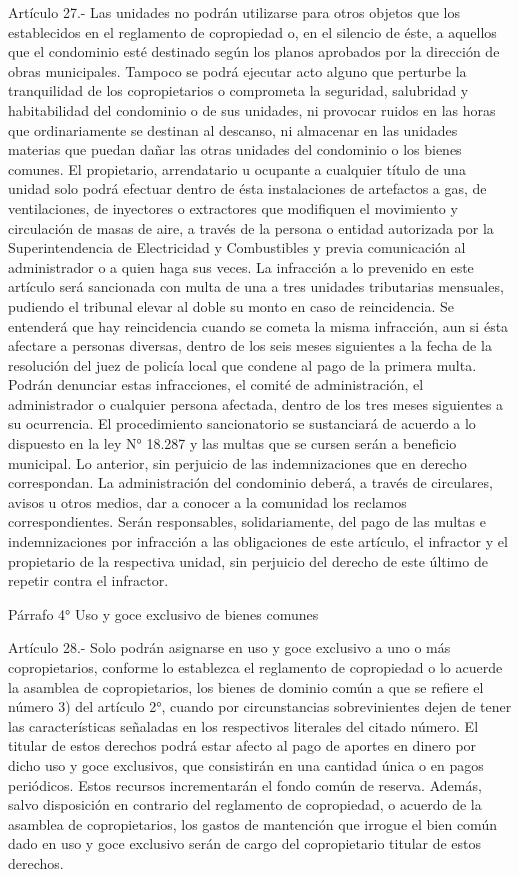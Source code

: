      
    Artículo 27.- Las unidades no podrán utilizarse para otros objetos que los establecidos en el reglamento de copropiedad o, en el silencio de éste, a aquellos que el condominio esté destinado según los planos aprobados por la dirección de obras municipales. Tampoco se podrá ejecutar acto alguno que perturbe la tranquilidad de los copropietarios o comprometa la seguridad, salubridad y habitabilidad del condominio o de sus unidades, ni provocar ruidos en las horas que ordinariamente se destinan al descanso, ni almacenar en las unidades materias que puedan dañar las otras unidades del condominio o los bienes comunes.
    El propietario, arrendatario u ocupante a cualquier título de una unidad solo podrá efectuar dentro de ésta instalaciones de artefactos a gas, de ventilaciones, de inyectores o extractores que modifiquen el movimiento y circulación de masas de aire, a través de la persona o entidad autorizada por la Superintendencia de Electricidad y Combustibles y previa comunicación al administrador o a quien haga sus veces.
    La infracción a lo prevenido en este artículo será sancionada con multa de una a tres unidades tributarias mensuales, pudiendo el tribunal elevar al doble su monto en caso de reincidencia. Se entenderá que hay reincidencia cuando se cometa la misma infracción, aun si ésta afectare a personas diversas, dentro de los seis meses siguientes a la fecha de la resolución del juez de policía local que condene al pago de la primera multa. Podrán denunciar estas infracciones, el comité de administración, el administrador o cualquier persona afectada, dentro de los tres meses siguientes a su ocurrencia. El procedimiento sancionatorio se sustanciará de acuerdo a lo dispuesto en la ley N° 18.287 y las multas que se cursen serán a beneficio municipal. Lo anterior, sin perjuicio de las indemnizaciones que en derecho correspondan.
    La administración del condominio deberá, a través de circulares, avisos u otros medios, dar a conocer a la comunidad los reclamos correspondientes.
    Serán responsables, solidariamente, del pago de las multas e indemnizaciones por infracción a las obligaciones de este artículo, el infractor y el propietario de la respectiva unidad, sin perjuicio del derecho de este último de repetir contra el infractor.
   
    Párrafo 4°
    Uso y goce exclusivo de bienes comunes

     
    Artículo 28.- Solo podrán asignarse en uso y goce exclusivo a uno o más copropietarios, conforme lo establezca el reglamento de copropiedad o lo acuerde la asamblea de copropietarios, los bienes de dominio común a que se refiere el número 3) del artículo 2°, cuando por circunstancias sobrevinientes dejen de tener las características señaladas en los respectivos literales del citado número. El titular de estos derechos podrá estar afecto al pago de aportes en dinero por dicho uso y goce exclusivos, que consistirán en una cantidad única o en pagos periódicos. Estos recursos incrementarán el fondo común de reserva. Además, salvo disposición en contrario del reglamento de copropiedad, o acuerdo de la asamblea de copropietarios, los gastos de mantención que irrogue el bien común dado en uso y goce exclusivo serán de cargo del copropietario titular de estos derechos.
   
